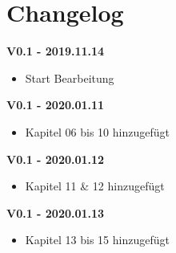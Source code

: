 \chapter{Changelog}
\large\textbf{V0.1 - 2019.11.14}\\[-1.5em]
\begin{itemize}
\item Start Bearbeitung
\end{itemize}
\large\textbf{V0.1 - 2020.01.11}\\[-1.5em]
\begin{itemize}
\item Kapitel 06 bis 10 hinzugefügt
\end{itemize}
\large\textbf{V0.1 - 2020.01.12}\\[-1.5em]
\begin{itemize}
\item Kapitel 11 \& 12 hinzugefügt
\end{itemize}
\large\textbf{V0.1 - 2020.01.13}\\[-1.5em]
\begin{itemize}
\item Kapitel 13 bis 15 hinzugefügt
\end{itemize}
